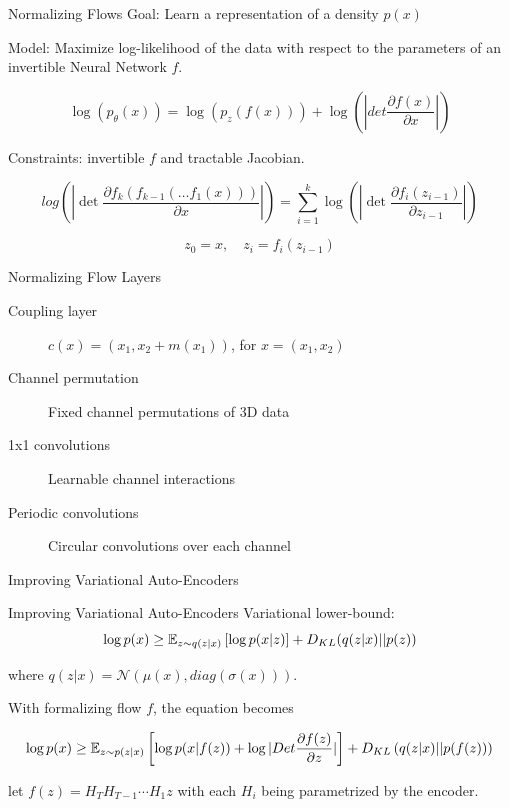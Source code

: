\begin{frame}{Normalizing Flows}
 	\alert{Goal:} Learn a representation of a density $p(x)$ 

	\alert{Model:} Maximize log-likelihood of the data with respect to the parameters of an invertible Neural Network $f$.

	$$
		\log( p_\theta(x) ) = \log( p_z(f(x)) ) + \log( | det \frac{\partial f(x)}{\partial x}| )
	$$

	\alert{Constraints:} invertible $f$ and tractable Jacobian.


	$$
		log\left( | \det  \frac{\partial f_k(f_{k-1}(\dots f_1(x)))}{\partial x} | \right) = \sum_{i=1}^k \log \left( | \det \frac{\partial f_i(z_{i-1})}{\partial z_{i-1}} | \right)
	$$

	$$
		z_0 = x, \quad z_i = f_{i}(z_{i-1})
	$$
\end{frame}

\begin{frame}{Normalizing Flow Layers}
	\begin{description}
		\item[Coupling layer] $c(x) = (x_1, x_2 + m(x_1))$, for $x = (x_1, x_2)$~\cite{nice}
		\item[Channel permutation] Fixed channel permutations of 3D data~\cite{realnvp}
		\item[1x1 convolutions] Learnable channel interactions~\cite{glow}
		\item[Periodic convolutions] Circular convolutions over each channel~\cite{emerging}
	\end{description}
\end{frame}





\begin{frame}[standout]
	Improving Variational Auto-Encoders
\end{frame}

\begin{frame}{Improving Variational Auto-Encoders}
	Variational lower-bound:
	$$
		\log p(x) \geq \mathbb{E}_{z \sim q(z | x)}\left[ \log p(x | z) \right] + D_{KL}(q(z|x) || p(z))
	$$

	where $q(z|x) = \mathcal{N}(\mu(x), diag(\sigma(x)))$.

	With formalizing flow $f$, the equation becomes

	$$
	\log p(x) \geq  \mathbb{E}_{z\sim p(z|x)}\left[ \log p(x|f(z)) + \log |Det\frac{\partial f(z)}{\partial z}|\right] + D_{KL}\left(q(z|x) || p(f(z))\right)
	$$

	\cite{houseVAE} let $f(z) = H_TH_{T-1}\cdots H_1z$ with each $H_i$ being parametrized by the encoder.
	
\end{frame}

